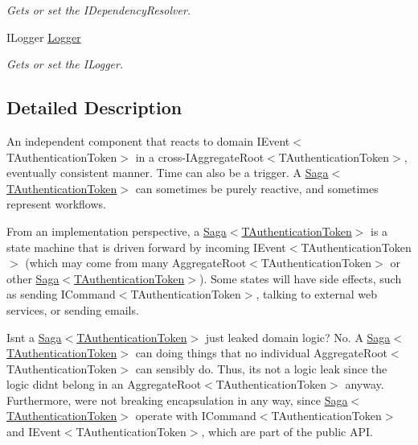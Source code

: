 \begin{DoxyCompactItemize}
\begin{DoxyCompactList}\small\item\em Gets or set the I\+Dependency\+Resolver. \end{DoxyCompactList}\item 
I\+Logger \hyperlink{classCqrs_1_1Domain_1_1Saga_aafb1c7c3c83211709322470a8fd150b5_aafb1c7c3c83211709322470a8fd150b5}{Logger}
\begin{DoxyCompactList}\small\item\em Gets or set the I\+Logger. \end{DoxyCompactList}\end{DoxyCompactItemize}


\subsection{Detailed Description}
An independent component that reacts to domain I\+Event$<$\+T\+Authentication\+Token$>$ in a cross-\/I\+Aggregate\+Root$<$\+T\+Authentication\+Token$>$, eventually consistent manner. Time can also be a trigger. A \hyperlink{classCqrs_1_1Domain_1_1Saga_a1b6019cecbbf2572b64dd456cb5d91a2_a1b6019cecbbf2572b64dd456cb5d91a2}{Saga$<$\+T\+Authentication\+Token$>$} can sometimes be purely reactive, and sometimes represent workflows. 

From an implementation perspective, a \hyperlink{classCqrs_1_1Domain_1_1Saga_a1b6019cecbbf2572b64dd456cb5d91a2_a1b6019cecbbf2572b64dd456cb5d91a2}{Saga$<$\+T\+Authentication\+Token$>$} is a state machine that is driven forward by incoming I\+Event$<$\+T\+Authentication\+Token$>$ (which may come from many Aggregate\+Root$<$\+T\+Authentication\+Token$>$ or other \hyperlink{classCqrs_1_1Domain_1_1Saga_a1b6019cecbbf2572b64dd456cb5d91a2_a1b6019cecbbf2572b64dd456cb5d91a2}{Saga$<$\+T\+Authentication\+Token$>$}). Some states will have side effects, such as sending I\+Command$<$\+T\+Authentication\+Token$>$, talking to external web services, or sending emails. 

Isn\textquotesingle{}t a \hyperlink{classCqrs_1_1Domain_1_1Saga_a1b6019cecbbf2572b64dd456cb5d91a2_a1b6019cecbbf2572b64dd456cb5d91a2}{Saga$<$\+T\+Authentication\+Token$>$} just leaked domain logic? No. A \hyperlink{classCqrs_1_1Domain_1_1Saga_a1b6019cecbbf2572b64dd456cb5d91a2_a1b6019cecbbf2572b64dd456cb5d91a2}{Saga$<$\+T\+Authentication\+Token$>$} can doing things that no individual Aggregate\+Root$<$\+T\+Authentication\+Token$>$ can sensibly do. Thus, it\textquotesingle{}s not a logic leak since the logic didn\textquotesingle{}t belong in an Aggregate\+Root$<$\+T\+Authentication\+Token$>$ anyway. Furthermore, we\textquotesingle{}re not breaking encapsulation in any way, since \hyperlink{classCqrs_1_1Domain_1_1Saga_a1b6019cecbbf2572b64dd456cb5d91a2_a1b6019cecbbf2572b64dd456cb5d91a2}{Saga$<$\+T\+Authentication\+Token$>$} operate with I\+Command$<$\+T\+Authentication\+Token$>$ and I\+Event$<$\+T\+Authentication\+Token$>$, which are part of the public A\+PI.

